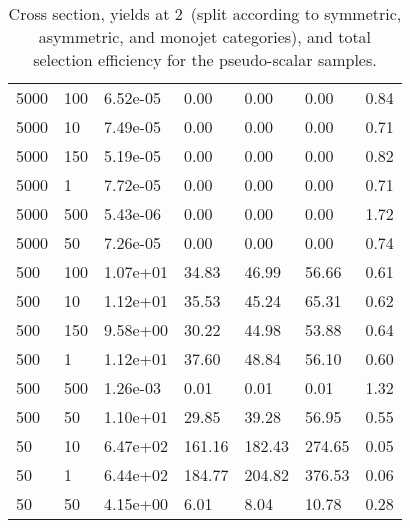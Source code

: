 \begin{table}
\begin{tabular}{lllllll}
5000      &   100       &   6.52e-05  &   0.00      &   0.00      &   0.00      &   0.84      \\ 
5000      &   10        &   7.49e-05  &   0.00      &   0.00      &   0.00      &   0.71      \\ 
5000      &   150       &   5.19e-05  &   0.00      &   0.00      &   0.00      &   0.82      \\ 
5000      &   1         &   7.72e-05  &   0.00      &   0.00      &   0.00      &   0.71      \\ 
5000      &   500       &   5.43e-06  &   0.00      &   0.00      &   0.00      &   1.72      \\ 
5000      &   50        &   7.26e-05  &   0.00      &   0.00      &   0.00      &   0.74      \\ 
500       &   100       &   1.07e+01  &   34.83     &   46.99     &   56.66     &   0.61      \\ 
500       &   10        &   1.12e+01  &   35.53     &   45.24     &   65.31     &   0.62      \\ 
500       &   150       &   9.58e+00  &   30.22     &   44.98     &   53.88     &   0.64      \\ 
500       &   1         &   1.12e+01  &   37.60     &   48.84     &   56.10     &   0.60      \\ 
500       &   500       &   1.26e-03  &   0.01      &   0.01      &   0.01      &   1.32      \\ 
500       &   50        &   1.10e+01  &   29.85     &   39.28     &   56.95     &   0.55      \\ 
50        &   10        &   6.47e+02  &   161.16    &   182.43    &   274.65    &   0.05      \\ 
50        &   1         &   6.44e+02  &   184.77    &   204.82    &   376.53    &   0.06      \\ 
50        &   50        &   4.15e+00  &   6.01      &   8.04      &   10.78     &   0.28      \\ 
\hline
\end{tabular}
\caption{Cross section, yields at 2~\ifb (split according to symmetric, asymmetric, and monojet categories), and total selection efficiency for the pseudo-scalar \DMj samples.}
\label{summaryTableAN_DMP_xs10_g1p0_2p1fb_exp}
\end{table}
